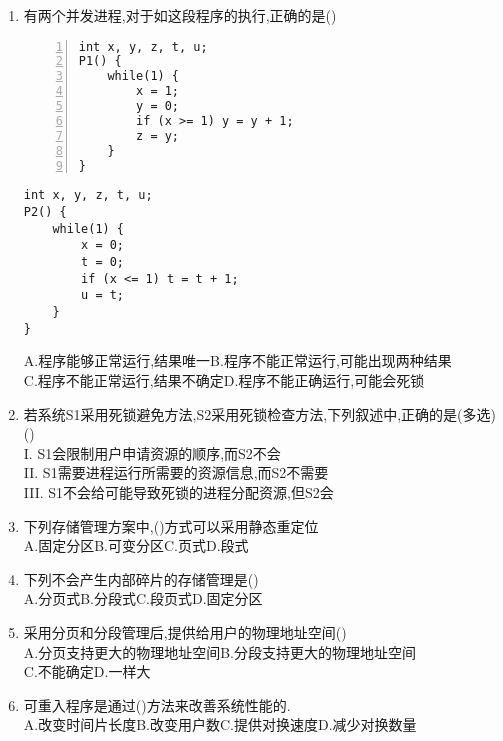 \documentclass[12pt, a4paper, oneside, UTF8]{ctexbook}
\begin{document}
\begin{enumerate}
    \item 有两个并发进程,对于如这段程序的执行,正确的是() 
\begin{center}
    \begin{minipage}[t]{0.45\textwidth}
        \begin{lstlisting}[numbers=left]
int x, y, z, t, u;
P1() {
    while(1) {
        x = 1;
        y = 0;
        if (x >= 1) y = y + 1;
        z = y;
    }
}
    \end{lstlisting}
\end{minipage}
\hfil
\begin{minipage}[t]{0.45\textwidth}
    \begin{lstlisting}
int x, y, z, t, u;
P2() {
    while(1) {
        x = 0;
        t = 0;
        if (x <= 1) t = t + 1;
        u = t;
    }
}
            \end{lstlisting}
        \end{minipage}
    \end{center}
    A.程序能够正常运行,结果唯一\qquad B.程序不能正常运行,可能出现两种结果\\
    C.程序不能正常运行,结果不确定\qquad D.程序不能正确运行,可能会死锁


    \item 若系统S1采用死锁避免方法,S2采用死锁检查方法,下列叙述中,正确的是(多选)() \\
    I. S1会限制用户申请资源的顺序,而S2不会 \\
    II. S1需要进程运行所需要的资源信息,而S2不需要 \\
    III. S1不会给可能导致死锁的进程分配资源,但S2会

    \item 下列存储管理方案中,()方式可以采用静态重定位 \\
    A.固定分区\qquad B.可变分区\qquad C.页式\qquad D.段式

    \item 下列不会产生内部碎片的存储管理是() \\
    A.分页式\qquad B.分段式\qquad C.段页式\qquad D.固定分区

    \item 采用分页和分段管理后,提供给用户的物理地址空间() \\
    A.分页支持更大的物理地址空间\qquad B.分段支持更大的物理地址空间 \\
    C.不能确定\qquad D.一样大

    \item 可重入程序是通过()方法来改善系统性能的. \\
    A.改变时间片长度\qquad B.改变用户数\qquad C.提供对换速度\qquad D.减少对换数量 


\end{enumerate}
\end{document}
